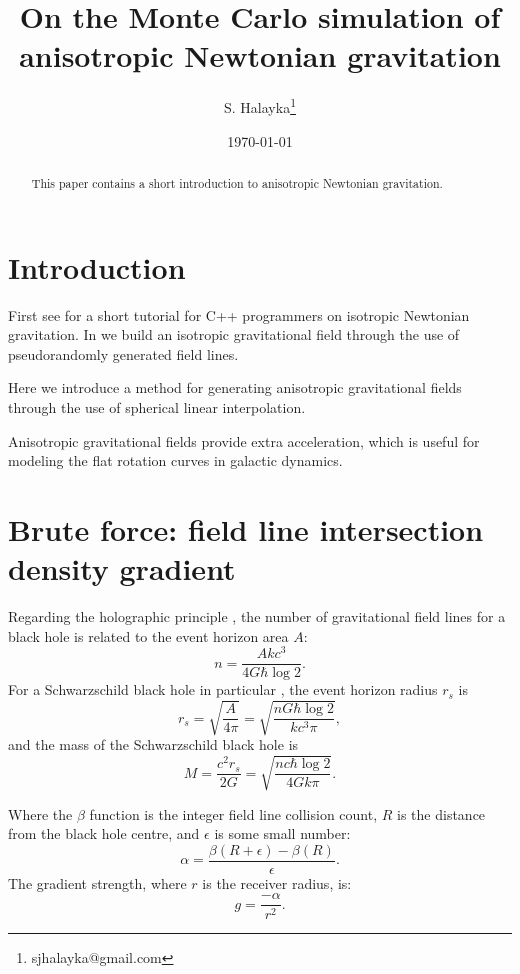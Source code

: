\documentclass[12pt]{article}
\title{On the Monte Carlo simulation of anisotropic Newtonian gravitation}
\author{S. Halayka\footnote{sjhalayka@gmail.com}}
\date{\today\;\currenttime}
\begin{document}
 
\maketitle

\begin{abstract}
This paper contains a short introduction to anisotropic Newtonian gravitation.
\end{abstract}



\section{Introduction}

First see \cite{halayka} for a short tutorial for C++ programmers on isotropic Newtonian gravitation.
In \cite{halayka} we build an isotropic gravitational field through the use of pseudorandomly generated field lines.

Here we introduce a method for generating anisotropic gravitational fields through the use of spherical linear interpolation.

Anisotropic gravitational fields provide extra acceleration, which is useful for modeling the flat rotation curves in galactic dynamics.





\section{Brute force: field line intersection density gradient}

Regarding the holographic principle \cite{hooft, susskind}, the number of gravitational field lines for a black hole is related to the event horizon area $A$:
\begin{equation}
n = \frac{A k c^3}{ 4 G \hbar \log 2}.
\end{equation}
For a Schwarzschild black hole in particular \cite{misner}, the event horizon radius $r_s$ is
\begin{equation}
r_s = \sqrt{\frac{A}{4 \pi}} = \sqrt{\frac{n G \hbar \log 2}{k c^3 \pi}},
\end{equation}
and the mass of the Schwarzschild black hole is
\begin{equation}
M = \frac{c^2 r_s}{2 G} = \sqrt{\frac{n c \hbar \log 2}{4 G k \pi}}.
\end{equation}

Where the $\beta$ function is the integer field line collision count, $R$ is the distance from the black hole centre, and $\epsilon$ is some small number:
\begin{equation}
\alpha = \frac{\beta(R + \epsilon) - \beta(R)}{\epsilon}.
\end{equation}
The gradient strength, where $r$ is the receiver radius, is:
\begin{equation}
g = \frac{-\alpha}{r^2}. 
\end{equation}
\end{document}
